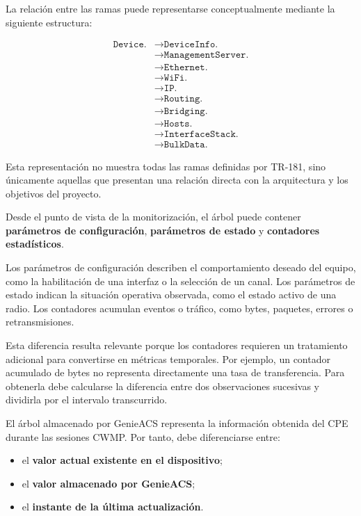 La relación entre las ramas puede representarse conceptualmente mediante
la siguiente estructura:

\[
\begin{aligned}
    \texttt{Device.}
    &\longrightarrow \texttt{DeviceInfo.}\\
    &\longrightarrow \texttt{ManagementServer.}\\
    &\longrightarrow \texttt{Ethernet.}\\
    &\longrightarrow \texttt{WiFi.}\\
    &\longrightarrow \texttt{IP.}\\
    &\longrightarrow \texttt{Routing.}\\
    &\longrightarrow \texttt{Bridging.}\\
    &\longrightarrow \texttt{Hosts.}\\
    &\longrightarrow \texttt{InterfaceStack.}\\
    &\longrightarrow \texttt{BulkData.}
\end{aligned}
\]

Esta representación no muestra todas las ramas definidas por TR-181,
sino únicamente aquellas que presentan una relación directa con la
arquitectura y los objetivos del proyecto.

Desde el punto de vista de la monitorización, el árbol puede contener
\textbf{parámetros de configuración}, \textbf{parámetros de estado} y
\textbf{contadores estadísticos}.

Los parámetros de configuración describen el comportamiento deseado del
equipo, como la habilitación de una interfaz o la selección de un canal.
Los parámetros de estado indican la situación operativa observada, como
el estado activo de una radio. Los contadores acumulan eventos o tráfico,
como bytes, paquetes, errores o retransmisiones.

Esta diferencia resulta relevante porque los contadores requieren un
tratamiento adicional para convertirse en métricas temporales. Por
ejemplo, un contador acumulado de bytes no representa directamente una
tasa de transferencia. Para obtenerla debe calcularse la diferencia entre
dos observaciones sucesivas y dividirla por el intervalo transcurrido.

El árbol almacenado por GenieACS representa la información obtenida del
CPE durante las sesiones CWMP. Por tanto, debe diferenciarse entre:

\begin{itemize}
    \item el \textbf{valor actual existente en el dispositivo};
    \item el \textbf{valor almacenado por GenieACS};
    \item el \textbf{instante de la última actualización}.
\end{itemize}

